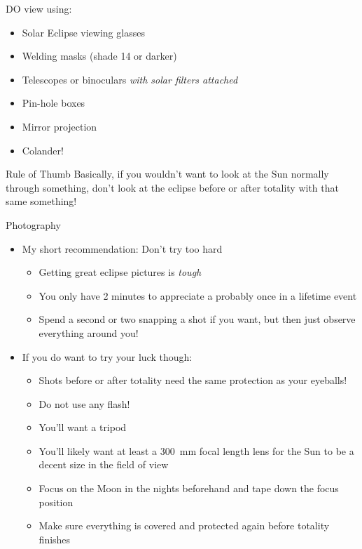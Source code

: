 \documentclass[pdf, aspectratio=169]{beamer}
\begin{document}
\begin{frame}{DO view using:}
	\begin{itemize}
		\item Solar Eclipse viewing glasses
		\item Welding masks (shade 14 or darker)
		\item Telescopes or binoculars \emph{with solar filters attached}
		\item Pin-hole boxes
		\item Mirror projection
		\item Colander!
	\end{itemize}
	\begin{block}{Rule of Thumb}
		Basically, if you wouldn't want to look at the Sun normally through something, don't look at the eclipse before or after totality with that same something!
	\end{block}
\end{frame}

\begin{frame}{Photography}
	\begin{itemize}
		\item My short recommendation: Don't try too hard
			\begin{itemize}
				\item Getting great eclipse pictures is \emph{tough}
				\item You only have 2 minutes to appreciate a probably once in a lifetime event
				\item Spend a second or two snapping a shot if you want, but then just observe everything around you!
			\end{itemize}
		\item If you do want to try your luck though:
			\begin{itemize}
				\item Shots before or after totality need the same protection as your eyeballs!
				\item \alert{Do not use any flash!}
				\item You'll want a tripod
				\item You'll likely want at least a \SI{300}{\milli\meter} focal length lens for the Sun to be a decent size in the field of view
				\item Focus on the Moon in the nights beforehand and tape down the focus position
				\item Make sure everything is covered and protected again before totality finishes
			\end{itemize}
	\end{itemize}
\end{frame}
\end{document}
